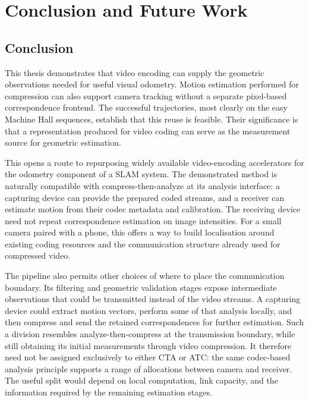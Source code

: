 
\chapter{Conclusion and Future Work}\label{chapter:conclusion}

\section{Conclusion}

This thesis demonstrates that video encoding can supply the geometric
observations needed for useful visual odometry. Motion estimation performed for
compression can also support camera tracking without a separate pixel-based
correspondence frontend. The successful trajectories, most clearly on the easy
Machine Hall sequences, establish that this reuse is feasible. Their significance
is that a representation produced for video coding can serve as the measurement
source for geometric estimation.

This opens a route to repurposing widely available video-encoding accelerators
for the odometry component of a SLAM system. The demonstrated method is naturally
compatible with compress-then-analyze at its analysis interface: a capturing
device can provide the prepared coded streams, and a receiver can estimate motion
from their codec metadata and calibration. The receiving device need not repeat
correspondence estimation on image intensities. For a small camera paired with a
phone, this offers a way to build localisation around existing coding resources
and the communication structure already used for compressed video.

The pipeline also permits other choices of where to place the communication
boundary. Its filtering and geometric validation stages expose intermediate
observations that could be transmitted instead of the video streams. A capturing
device could extract motion vectors, perform some of that analysis locally,
and then compress and send the retained correspondences for further estimation.
Such a division resembles analyze-then-compress at the transmission boundary,
while still obtaining its initial measurements through video compression. It
therefore need not be assigned exclusively to either CTA or ATC: the same
codec-based analysis principle supports a range of allocations between camera
and receiver. The useful split would depend on local computation, link capacity,
and the information required by the remaining estimation stages.

